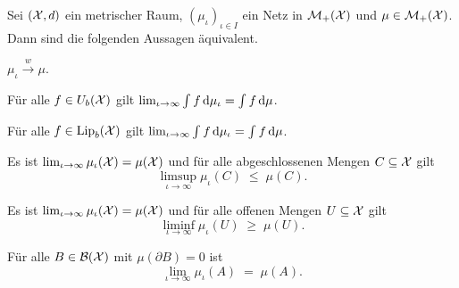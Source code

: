 \documentclass[../thesis/thesis.tex]{subfiles}
\begin{document}
	\begin{Satz}[Portmanteau]
		\label{satz:portmanteau}
		Sei $(\mathcal{X}, d)$ ein metrischer Raum, $(\mu_\iota)_{\iota \in I}$ ein Netz in $\mathcal{M}_{+}(\mathcal{X})$
		und $\mu \in \mathcal{M}_{+}(\mathcal{X})$. Dann sind die folgenden Aussagen äquivalent.
		\begin{equivalentthm}
			\item $\mu_\iota \xrightarrow{w} \mu$.
			\item Für alle $f \in U_b(\mathcal{X})$ gilt $\lim_{\iota \to \infty} \int_{} \, f \, \mathrm{d}\mu_\iota = \int_{} \, f \, \mathrm{d}\mu$.
			\item Für alle $f \in \mathrm{Lip}_b(\mathcal{X})$ gilt $\lim_{\iota \to \infty} \int_{} \, f \, \mathrm{d}\mu_\iota = \int_{} \, f \, \mathrm{d}\mu$.
			\item Es ist 
			$\lim_{\iota \to \infty} \mu_\iota(\mathcal{X}) = \mu(\mathcal{X})$
			und für alle abgeschlossenen Mengen $C \subseteq \mathcal{X}$ gilt 
			$$\limsup_{\iota \to \infty} \mu_\iota(C) \; \leq \; \mu(C) \text{.}$$
			\item Es ist 
			$\lim_{\iota \to \infty} \mu_\iota(\mathcal{X}) = \mu(\mathcal{X})$
			und für alle offenen Mengen $U \subseteq \mathcal{X}$ gilt 
			$$\liminf_{\iota \to \infty} \mu_\iota(U) \; \geq \; \mu(U) \text{.}$$
			\item Für alle $B \in \mathcal{B}(\mathcal{X})$ mit $\mu(\partial B) = 0$ 
			ist $$\lim_{\iota \to \infty} \mu_\iota(A) \; = \; \mu(A) \text{.}$$
		\end{equivalentthm}
	\end{Satz}
	
\end{document}
